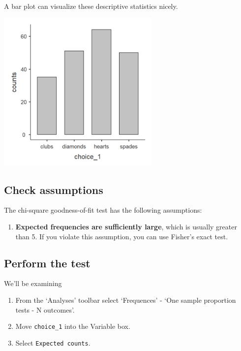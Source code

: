 \documentclass[
]{book}
\providecommand{\tightlist}{%
  \setlength{\itemsep}{0pt}\setlength{\parskip}{0pt}}
\begin{document}
A bar plot can visualize these descriptive statistics nicely.

\includegraphics[width=3.125in,height=\textheight]{images/09-chi-square/chi-square_bar.png}

\hypertarget{check-assumptions-3}{%
\subsection{Check assumptions}\label{check-assumptions-3}}

The chi-square goodness-of-fit test has the following assumptions:

\begin{enumerate}
\def\labelenumi{\arabic{enumi}.}
\tightlist
\item
  \textbf{Expected frequencies are sufficiently large}, which is usually greater than 5. If you violate this assumption, you can use Fisher's exact test.
\end{enumerate}

\hypertarget{perform-the-test-3}{%
\subsection{Perform the test}\label{perform-the-test-3}}

We'll be examining

\begin{enumerate}
\def\labelenumi{\arabic{enumi}.}
\item
  From the `Analyses' toolbar select `Frequences' - `One sample proportion tests - N outcomes'.
\item
  Move \texttt{choice\_1} into the Variable box.
\item
  Select \texttt{Expected\ counts}.
\end{enumerate}
\end{document}
